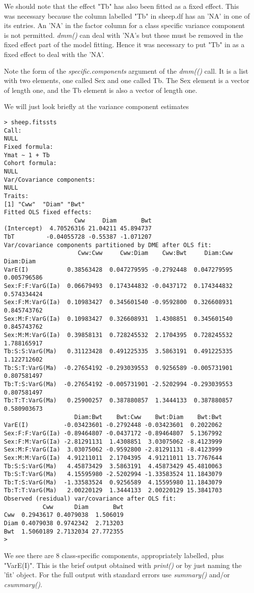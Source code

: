 \documentclass[titlepage]{article}  %
\begin{document}
We should note that the effect "Tb" has also been fitted as a fixed effect. This was necessary because the column labelled "Tb" in sheep.df has an 'NA' in one of its entries. An 'NA' in the factor column for a class specific variance component is not permitted. {\em dmm()} can deal with 'NA's but these must be  removed in the fixed effect part of the model fitting. Hence it was necessary to put "Tb" in as a fixed effect to deal with the 'NA'.

Note the form of the {\em specific.components} argument of the {\em dmm(()} call. It is a list with two elements, one called Sex and one called Tb. The Sex element is a vector of length one, and the Tb element is also a vector of length one.

We will just look briefly at the variance component estimates
\begin{verbatim}
> sheep.fitssts
Call:
NULL
Fixed formula:
Ymat ~ 1 + Tb
Cohort formula:
NULL
Var/Covariance components:
NULL
Traits:
[1] "Cww"  "Diam" "Bwt" 
Fitted OLS fixed effects:
                    Cww     Diam       Bwt
(Intercept)  4.70526316 21.04211 45.894737
TbT         -0.04055728 -0.55387 -1.071207
Var/covariance components partitioned by DME after OLS fit:
                     Cww:Cww     Cww:Diam    Cww:Bwt     Diam:Cww   Diam:Diam
VarE(I)           0.38563428  0.047279595 -0.2792448  0.047279595 0.005796586
Sex:F:F:VarG(Ia)  0.06679493  0.174344832 -0.0437172  0.174344832 0.574334424
Sex:F:M:VarG(Ia)  0.10983427  0.345601540 -0.9592800  0.326608931 0.845743762
Sex:M:F:VarG(Ia)  0.10983427  0.326608931  1.4308851  0.345601540 0.845743762
Sex:M:M:VarG(Ia)  0.39858131  0.728245532  2.1704395  0.728245532 1.788165917
Tb:S:S:VarG(Ma)   0.31123428  0.491225335  3.5863191  0.491225335 1.122712602
Tb:S:T:VarG(Ma)  -0.27654192 -0.293039553  0.9256589 -0.005731901 0.807581497
Tb:T:S:VarG(Ma)  -0.27654192 -0.005731901 -2.5202994 -0.293039553 0.807581497
Tb:T:T:VarG(Ma)   0.25900257  0.387880857  1.3444133  0.387880857 0.580903673
                    Diam:Bwt    Bwt:Cww    Bwt:Diam    Bwt:Bwt
VarE(I)          -0.03423601 -0.2792448 -0.03423601  0.2022062
Sex:F:F:VarG(Ia) -0.89464807 -0.0437172 -0.89464807  5.1367992
Sex:F:M:VarG(Ia) -2.81291131  1.4308851  3.03075062 -8.4123999
Sex:M:F:VarG(Ia)  3.03075062 -0.9592800 -2.81291131 -8.4123999
Sex:M:M:VarG(Ia)  4.91211011  2.1704395  4.91211011 13.7767644
Tb:S:S:VarG(Ma)   4.45873429  3.5863191  4.45873429 45.4810063
Tb:S:T:VarG(Ma)   4.15595980 -2.5202994 -1.33583524 11.1843079
Tb:T:S:VarG(Ma)  -1.33583524  0.9256589  4.15595980 11.1843079
Tb:T:T:VarG(Ma)   2.00220129  1.3444133  2.00220129 15.3841703
Observed (residual) var/covariance after OLS fit:
           Cww      Diam       Bwt
Cww  0.2943617 0.4079038  1.506019
Diam 0.4079038 0.9742342  2.713203
Bwt  1.5060189 2.7132034 27.772355
> 
\end{verbatim}
We see there are 8 class-specific components, appropriately labelled, plus "VarE(I)". This is the brief output obtained with {\em print()} or by just naming the 'fit' object. For the full output with standard errors use {\em summary()} and/or {\em csummary()}.
\end{document}
